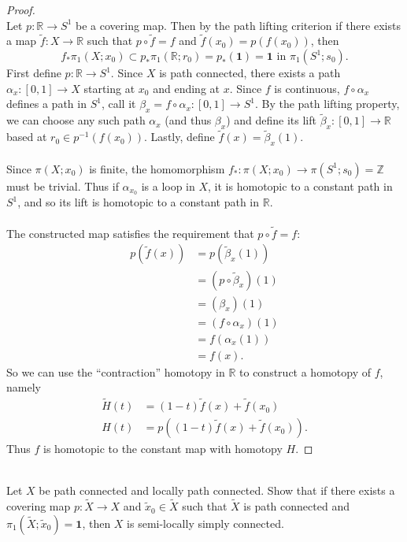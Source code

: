 \documentclass{article}
\newenvironment{problem}[2][Problem]{\begin{trivlist}
\item[\hskip \labelsep {\bfseries #1}\hskip \labelsep {\bfseries #2.}]}{\end{trivlist}}
\begin{document}
\begin{proof} \text{} \\
  Let $p\colon \mathbb R \rightarrow S^1$ be a covering map. Then by the path
  lifting criterion if there exists a map
  $\widetilde f \colon X \rightarrow \mathbb R$ such that $p \circ \widetilde f = f$
  and $\widetilde f(x_0) = p(f(x_0))$, then \[
    f_* \pi_1(X; x_0)
    \subset p_* \pi_1(\mathbb R; r_0)
    = p_*(\mathbf{1})
    = \mathbf{1} \text{ in } \pi_1(S^1; s_0).
  \]
  First define $p\colon \mathbb R \rightarrow S^1$.
  Since $X$ is path connected, there exists a path
  $\alpha_x \colon[0, 1] \rightarrow X$ starting at $x_0$ and ending at $x$.
  Since $f$ is continuous, $f \circ \alpha_x$ defines a path in $S^1$, call it
  $\beta_x = f \circ \alpha_x \colon [0, 1] \rightarrow S^1$.
  By the path lifting property, we can choose any such path $\alpha_x$
  (and thus $\beta_x$) and define its lift
  $\widetilde \beta_x \colon [0,1] \rightarrow \mathbb R$ based at
  $r_0 \in p^{-1}(f(x_0))$.
  Lastly, define $\widetilde f(x) = \widetilde \beta_x(1)$.
  \\~\\
  Since $\pi(X; x_0)$ is finite, the homomorphism
  $f_*\colon\pi(X; x_0) \rightarrow \pi(S^1; s_0) = \mathbb Z$ must be trivial.
  Thus if $\alpha_{x_0}$ is a loop in $X$, it is homotopic to a constant path in
  $S^1$, and so its lift is homotopic to a constant path in $\mathbb R$.
  \\~\\
  The constructed map satisfies the requirement that $p \circ \widetilde f = f$:
  \begin{align*}
    p(\widetilde f(x)) &= p(\widetilde \beta_x(1)) \\
    &= (p \circ \widetilde \beta_x)(1) \\
    &= (\beta_x)(1) \\
    &= (f \circ \alpha_x)(1) \\
    &= f(\alpha_x(1)) \\
    &= f(x).
  \end{align*}
  So we can use the ``contraction'' homotopy in $\mathbb R$ to construct a
  homotopy of $f$, namely \begin{align*}
    \widetilde  H(t) &= (1 - t)\widetilde{f}(x) + \widetilde{f}(x_0) \\
    H(t) &= p((1 - t)\widetilde{f}(x) + \widetilde{f}(x_0)).
  \end{align*}
  Thus $f$ is homotopic to the constant map with homotopy $H$.
\end{proof}
\pagebreak
\begin{problem}{2} \text{} \\
  Let $X$ be path connected and locally path connected. Show that if there
  exists a covering map $p\colon \widetilde X \rightarrow X$ and
  $\widetilde x_0 \in \widetilde X$ such that $\widetilde X$ is path connected
  and $\pi_1(\widetilde X; \widetilde x_0) = \mathbf{1}$, then $X$ is
  semi-locally simply connected.
\end{problem}
\end{document}
